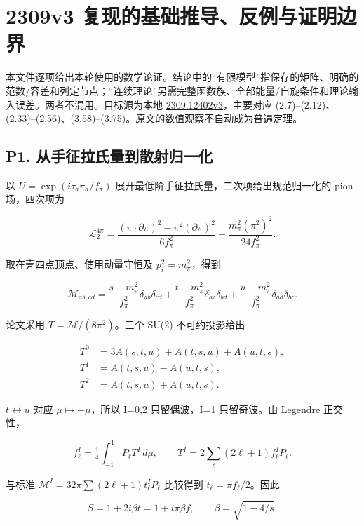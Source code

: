 \documentclass[
  11pt,
  a4paper,
]{article}
\begin{document}
\newpage

\section{2309v3
复现的基础推导、反例与证明边界}\label{v3-ux590dux73b0ux7684ux57faux7840ux63a8ux5bfcux53cdux4f8bux4e0eux8bc1ux660eux8fb9ux754c}

本文件逐项给出本轮使用的数学论证。结论中的``有限模型''指保存的矩阵、明确的范数/容差和列定节点；``连续理论''另需完整函数族、全部能量/自旋条件和理论输入误差。两者不混用。目标源为本地
\href{../../../references/2309.12402v3.pdf}{2309.12402v3}，主要对应
(2.7)--(2.12)、(2.33)--(2.56)、(3.58)--(3.75)。原文的数值观察不自动成为普遍定理。

\subsection{P1.
从手征拉氏量到散射归一化}\label{p1.-ux4eceux624bux5f81ux62c9ux6c0fux91cfux5230ux6563ux5c04ux5f52ux4e00ux5316}

以 \(U=\exp(i\tau_a\pi_a/f_\pi)\)
展开最低阶手征拉氏量，二次项给出规范归一化的 pion 场，四次项为

\[
\mathcal L^{4\pi}_2=\frac{(\pi\cdot\partial\pi)^2-\pi^2(\partial\pi)^2}{6f_\pi^2}
+\frac{m_\pi^2(\pi^2)^2}{24f_\pi^2}.
\]

取在壳四点顶点、使用动量守恒及 \(p_i^2=m_\pi^2\)，得到

\[
\mathcal M_{ab,cd}=\frac{s-m_\pi^2}{f_\pi^2}\delta_{ab}\delta_{cd}
+\frac{t-m_\pi^2}{f_\pi^2}\delta_{ac}\delta_{bd}
+\frac{u-m_\pi^2}{f_\pi^2}\delta_{ad}\delta_{bc}.
\]

论文采用 \(T=\mathcal M/(8\pi^2)\)。三个 SU(2) 不可约投影给出

\[
\begin{aligned}
T^0&=3A(s,t,u)+A(t,s,u)+A(u,t,s),\\
T^1&=A(t,s,u)-A(u,t,s),\\
T^2&=A(t,s,u)+A(u,t,s).
\end{aligned}
\]

\(t\leftrightarrow u\) 对应 \(\mu\mapsto-\mu\)，所以 I=0,2 只留偶波，I=1
只留奇波。由 Legendre 正交性，

\[
f^I_\ell=\tfrac14\int_{-1}^{1}P_\ell T^I\,d\mu,
\qquad T^I=2\sum_\ell(2\ell+1)f^I_\ell P_\ell.
\]

与标准 \(\mathcal M^I=32\pi\sum(2\ell+1)t^I_\ell P_\ell\) 比较得到
\(t_\ell=\pi f_\ell/2\)。因此

\[
S=1+2i\beta t=1+i\pi\beta f,\qquad\beta=\sqrt{1-4/s}.
\]
\end{document}

